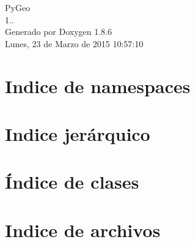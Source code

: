 \documentclass[twoside]{book}
\newcommand{\clearemptydoublepage}{%
  \newpage{\pagestyle{empty}\cleardoublepage}%
}
\begin{document}
\begin{titlepage}
\vspace*{7cm}
\begin{center}%
{\Large Py\-Geo \\[1ex]\large 1.. }\\
\vspace*{1cm}
{\large Generado por Doxygen 1.8.6}\\
\vspace*{0.5cm}
{\small Lunes, 23 de Marzo de 2015 10:57:10}\\
\end{center}
\end{titlepage}
\clearemptydoublepage
\tableofcontents
\clearemptydoublepage
{}

\chapter{Indice de namespaces}

\chapter{Indice jerárquico}

\chapter{Índice de clases}

\chapter{Indice de archivos}

\end{document}
